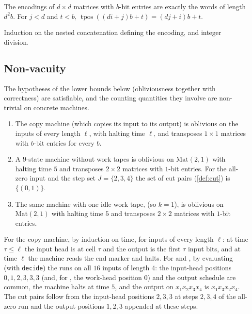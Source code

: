 \begin{lemma}\label{lem:encoding}
The encodings of $d\times d$ matrices with $b$-bit entries are exactly the words of length $d^2b$.
For $j<d$ and $t<b$, $\operatorname{tpos}((di+j)b+t)=(dj+i)b+t$.
\end{lemma}

\begin{outline}
Induction on the nested concatenation defining the encoding, and integer division.
\end{outline}

\subsection{Non-vacuity}

The hypotheses of the lower bounds below (obliviousness together with correctness) are
satisfiable, and the counting quantities they involve are non-trivial on concrete machines.

\begin{proposition}\label{prop:witnesses}
\begin{enumerate}[label=(\alph*)]
\item The copy machine (which copies its input to its output) is oblivious on the inputs of every
length $\ell$, with halting time $\ell$, and transposes $1\times1$ matrices with $b$-bit entries
for every $b$.
\item A $9$-state machine  without work tapes is oblivious on $\mathrm{Mat}(2,1)$
with halting time $5$ and transposes $2\times2$ matrices with $1$-bit entries. For the all-zero
input and the step set $J=\{2,3,4\}$ the set of cut pairs (\cref{def:cut}) is $\{(0,1)\}$.
\item The same machine with one idle work tape,  (so $k=1$), is oblivious on
$\mathrm{Mat}(2,1)$ with halting time $5$ and transposes $2\times2$ matrices with $1$-bit entries.
\end{enumerate}
\end{proposition}

\begin{outline}
For the copy machine, by induction on time, for inputs of every length $\ell$: at time $\tau\le\ell$
the input head is at cell $\tau$ and the output is the first $\tau$ input bits, and at time $\ell$ the
machine reads the end marker and halts. For  and , by evaluating
(with \texttt{decide}) the runs on all $16$ inputs of length $4$: the input-head positions $0,1,2,3,3,3$ (and, for , the work-head position $0$) and the output schedule are common, the machine halts at time $5$, and the output on
$x_1x_2x_3x_4$ is $x_1x_3x_2x_4$. The cut pairs follow from the input-head positions $2,3,3$ at steps $2,3,4$ of the
all-zero run and the output positions $1,2,3$ appended at these steps.
\end{outline}
